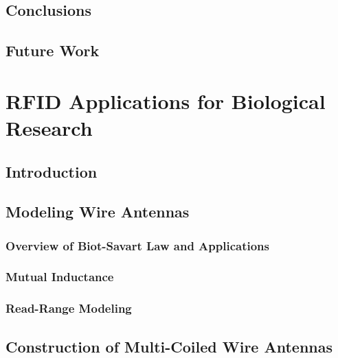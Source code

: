 \documentclass[12pt,onecolumn]{report}
\begin{document}
    \section{Conclusions}
    \section{Future Work}


\chapter{RFID Applications for Biological Research}
    \section{Introduction}
        
    \section{Modeling Wire Antennas}
        \subsection{Overview of Biot-Savart Law and Applications}
        \subsection{Mutual Inductance}
        \subsection{Read-Range Modeling} 
    \section{Construction of Multi-Coiled Wire Antennas}
\end{document}

